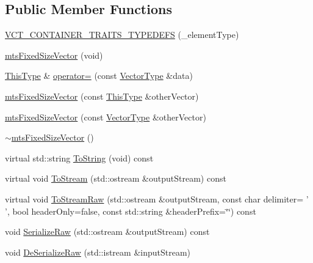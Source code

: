 \subsection*{Public Member Functions}
\begin{DoxyCompactItemize}
\item 
\hyperlink{classmts_fixed_size_vector_ac0fb65b6aaa65a9f41f8133af4f0790a}{V\-C\-T\-\_\-\-C\-O\-N\-T\-A\-I\-N\-E\-R\-\_\-\-T\-R\-A\-I\-T\-S\-\_\-\-T\-Y\-P\-E\-D\-E\-F\-S} (\-\_\-element\-Type)
\item 
\hyperlink{classmts_fixed_size_vector_a67b73e64d28ba115f404a75885d38fbd}{mts\-Fixed\-Size\-Vector} (void)
\item 
\hyperlink{classvct_fixed_size_const_vector_base_a071063bc4fa43112cc287b2dbef53180}{This\-Type} \& \hyperlink{classmts_fixed_size_vector_ac2a893cd8e28d1763e0191ec0cb42de4}{operator=} (const \hyperlink{classmts_fixed_size_vector_ac5c774708b6dab6c0fe332c5fcd2c5ad}{Vector\-Type} \&data)
\item 
\hyperlink{classmts_fixed_size_vector_ab6cecc2d95a42c5c8699aa4bd7c41059}{mts\-Fixed\-Size\-Vector} (const \hyperlink{classvct_fixed_size_const_vector_base_a071063bc4fa43112cc287b2dbef53180}{This\-Type} \&other\-Vector)
\item 
\hyperlink{classmts_fixed_size_vector_a2c1b3efb6b5de2c43d711dcbc99fec41}{mts\-Fixed\-Size\-Vector} (const \hyperlink{classmts_fixed_size_vector_ac5c774708b6dab6c0fe332c5fcd2c5ad}{Vector\-Type} \&other\-Vector)
\item 
\hyperlink{classmts_fixed_size_vector_a8d9f7fad00c8c072417bc9427018ad2c}{$\sim$mts\-Fixed\-Size\-Vector} ()
\item 
virtual std\-::string \hyperlink{classmts_fixed_size_vector_a318f3eb6372065a90888e5b0cc01ae34}{To\-String} (void) const 
\item 
virtual void \hyperlink{classmts_fixed_size_vector_ad25311e7d7650747d5261a4c5de2a26a}{To\-Stream} (std\-::ostream \&output\-Stream) const 
\item 
virtual void \hyperlink{classmts_fixed_size_vector_ac057837550f642d88932a66ab13f5215}{To\-Stream\-Raw} (std\-::ostream \&output\-Stream, const char delimiter= ' ', bool header\-Only=false, const std\-::string \&header\-Prefix=\char`\"{}\char`\"{}) const 
\item 
void \hyperlink{classmts_fixed_size_vector_a35d316468abf5e8d78841d0a0525f063}{Serialize\-Raw} (std\-::ostream \&output\-Stream) const 
\item 
void \hyperlink{classmts_fixed_size_vector_a353769eeb40e54bcdae6aaf23c1e5748}{De\-Serialize\-Raw} (std\-::istream \&input\-Stream)
\end{DoxyCompactItemize}
